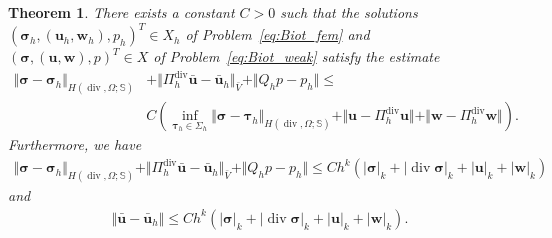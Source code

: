 \documentclass[11pt]{amsart}
\newtheorem{theorem}{Theorem}
\theoremstyle{remark}
\theoremstyle{definition}
\def\sig{{\bm \sigma}}
\def\btau{{\bm \tau}}
\def\bu{{\boldsymbol u}}
\def\bw{{\boldsymbol w}}
\renewcommand{\div}{\operatorname{div}}
\renewcommand{\div}{\operatorname{div}}
\def\sig{\boldsymbol \sigma}
\def\bu{\boldsymbol u}
\def\bw{\boldsymbol w}
\begin{document}
\begin{theorem}\label{thm:near_best_approx0}
There exists a constant $C >0$ such that the solutions $(\sig_h,(\bu_h,\bw_h),p_h)^T \in X_h$ of
Problem~\eqref{eq:Biot_fem} and $(\sig,(\bu,\bw),p)^T \in X$ of Problem~\eqref{eq:Biot_weak} satisfy the estimate
%
\begin{align}\label{eq:near_best_approx1}
\Vert \sig - \sig_h \Vert_{H(\div,\Omega;\mathbb{S})} &\nonumber+ \Vert \Pi_h^{\div} \bar{\bu} - \bar{\bu}_h \Vert_{\bar{V}} + \Vert Q_hp - p_h \Vert
\le \\
&C \left(\inf_{\btau_h \in \Sigma_h}  
\Vert \sig - \btau_h \Vert_{H(\div,\Omega;\mathbb{S})}+ \Vert \bu- \Pi_h^{\div} \bu \Vert+\Vert \bw- \Pi_h^{\div} \bw \Vert\right).
\end{align} 
Furthermore, we have 
\begin{align}\label{eq:near_best_approx2}
\Vert \sig - \sig_h \Vert_{H(\div,\Omega;\mathbb{S})}+ \Vert \Pi_h^{\div} \bar{\bu} - \bar{\bu}_h \Vert_{\bar{V}} + \Vert Q_hp - p_h \Vert
\le C h^k \left(|\sig|_{k}+|\div\sig|_{k}+|\bu|_{k}+|\bw|_k \right)
\end{align} 
and 
\begin{align}\label{eq:near_best_approx3}
\Vert \bar{\bu} - \bar{\bu}_h \Vert
\le C h^k \left(|\sig|_k+|\div\sig|_k+|\bu|_k+|\bw|_k \right).
\end{align} 


\end{theorem}
\end{document}
